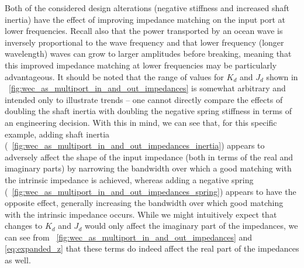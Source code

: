 \documentclass[5p,times]{elsarticle}
\begin{document}

Both of the considered design alterations (negative stiffness and increased shaft inertia) have the effect of improving impedance matching on the input port at lower frequencies.
Recall also that the power transported by an ocean wave is inversely proportional to the wave frequency and that lower frequency (longer wavelength) waves can grow to larger amplitudes before breaking, meaning that this improved impedance matching at lower frequencies may be particularly advantageous.
It should be noted that the range of values for $K_d$ and $J_d$ shown in \figurename~\ref{fig:wec_as_multiport_in_and_out_impedances} is somewhat arbitrary and intended only to illustrate trends -- one cannot directly compare the effects of doubling the shaft inertia with doubling the negative spring stiffness in terms of an engineering decision.
With this in mind, we can see that, for this specific example, adding shaft inertia (\figurename~\ref{fig:wec_as_multiport_in_and_out_impedances_inertia}) appears to adversely affect the shape of the input impedance (both in terms of the real and imaginary parts) by narrowing the bandwidth over which a good matching with the intrinsic impedance is achieved, whereas adding a negative spring (\figurename~\ref{fig:wec_as_multiport_in_and_out_impedances_spring}) appears to have the opposite effect, generally increasing the bandwidth over which good matching with the intrinsic impedance occurs.
While we might intuitively expect that changes to $K_d$ and $J_d$ would only affect the imaginary part of the impedances, we can see from \figurename~\ref{fig:wec_as_multiport_in_and_out_impedances} and \eqref{eq:expanded_z} that these terms do indeed affect the real part of the impedances as well.
\end{document}
